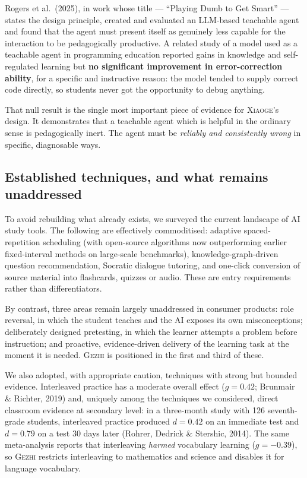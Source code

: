 \documentclass[11pt,a4paper]{article}
\newcommand{\gezhi}{\textsc{Gezhi}}
\newcommand{\xiaoge}{\textsc{Xiaoge}}
\begin{document}
Rogers et al.\ (2025), in work whose title --- ``Playing Dumb to Get Smart'' --- states the
design principle, created and evaluated an LLM-based teachable agent and found that the
agent must present itself as genuinely less capable for the interaction to be pedagogically
productive. A related study of a model used as a teachable agent in programming education
reported gains in knowledge and self-regulated learning but \textbf{no significant
improvement in error-correction ability}, for a specific and instructive reason: the model
tended to supply correct code directly, so students never got the opportunity to debug
anything.

That null result is the single most important piece of evidence for \xiaoge{}'s design. It
demonstrates that a teachable agent which is helpful in the ordinary sense is pedagogically
inert. The agent must be \emph{reliably and consistently wrong} in specific, diagnosable
ways.

\subsection{Established techniques, and what remains unaddressed}

To avoid rebuilding what already exists, we surveyed the current landscape of AI study
tools. The following are effectively commoditised: adaptive spaced-repetition scheduling
(with open-source algorithms now outperforming earlier fixed-interval methods on
large-scale benchmarks), knowledge-graph-driven question recommendation, Socratic dialogue
tutoring, and one-click conversion of source material into flashcards, quizzes or audio.
These are entry requirements rather than differentiators.

By contrast, three areas remain largely unaddressed in consumer products: role reversal, in
which the student teaches and the AI exposes its own misconceptions; deliberately designed
pretesting, in which the learner attempts a problem before instruction; and proactive,
evidence-driven delivery of the learning task at the moment it is needed. \gezhi{} is
positioned in the first and third of these.

We also adopted, with appropriate caution, techniques with strong but bounded evidence.
Interleaved practice has a moderate overall effect (\(g = 0.42\); Brunmair \& Richter, 2019)
and, uniquely among the techniques we considered, direct classroom evidence at secondary
level: in a three-month study with 126 seventh-grade students, interleaved practice produced
\(d = 0.42\) on an immediate test and \(d = 0.79\) on a test 30 days later (Rohrer, Dedrick
\& Stershic, 2014). The same meta-analysis reports that interleaving \emph{harmed} vocabulary
learning (\(g = -0.39\)), so \gezhi{} restricts interleaving to mathematics and science and
disables it for language vocabulary.
\end{document}
